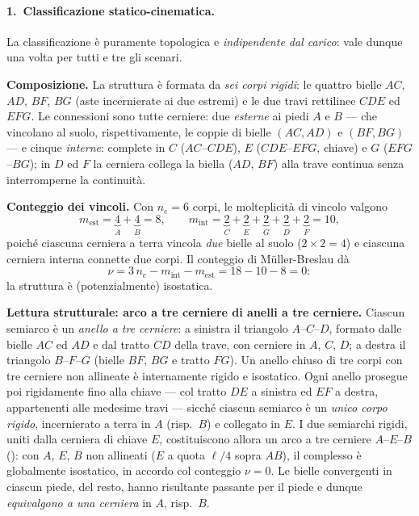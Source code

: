 \begin{esercizio}
	\begin{svolgimento}
	
	\paragraph{1.~Classificazione statico-cinematica.}
	La classificazione è puramente topologica e \emph{indipendente dal
		carico}: vale dunque una volta per tutti e tre gli scenari.
	
	\medskip\noindent\textbf{Composizione.}
	La struttura è formata da \emph{sei corpi rigidi}: le quattro bielle
	$AC$, $AD$, $BF$, $BG$ (aste incernierate ai due estremi) e le due travi
	rettilinee $CDE$ ed $EFG$. Le connessioni sono tutte cerniere: due
	\emph{esterne} ai piedi $A$ e $B$ --- che vincolano al suolo,
	rispettivamente, le coppie di bielle $(AC,AD)$ e $(BF,BG)$ --- e cinque
	\emph{interne}: complete in $C$ ($AC$--$CDE$), $E$ ($CDE$--$EFG$, chiave)
	e $G$ ($EFG$--$BG$); in $D$ ed $F$ la cerniera collega la biella ($AD$,
	$BF$) alla trave continua senza interromperne la continuità.
	
	\medskip\noindent\textbf{Conteggio dei vincoli.}
	Con $n_e=6$ corpi, le molteplicità di vincolo valgono
	\[
	m_{\mathrm{est}} = \underbrace{4}_{A} + \underbrace{4}_{B} = 8,
	\qquad
	m_{\mathrm{int}} = \underbrace{2}_{C} + \underbrace{2}_{E} + \underbrace{2}_{G}
	+ \underbrace{2}_{D} + \underbrace{2}_{F} = 10,
	\]
	poiché ciascuna cerniera a terra vincola \emph{due} bielle al suolo
	($2\times2=4$) e ciascuna cerniera interna connette due corpi. Il
	conteggio di Müller-Breslau dà
	\[
	\nu = 3\,n_e - m_{\mathrm{int}} - m_{\mathrm{est}} = 18 - 10 - 8 = 0:
	\]
	la struttura è (potenzialmente) isostatica.
	
	\medskip\noindent\textbf{Lettura strutturale: arco a tre cerniere di anelli
		a tre cerniere.}
	Ciascun semiarco è un \emph{anello a tre cerniere}: a sinistra il
	triangolo $A$--$C$--$D$, formato dalle bielle $AC$ ed $AD$ e dal tratto
	$CD$ della trave, con cerniere in $A$, $C$, $D$; a destra il triangolo
	$B$--$F$--$G$ (bielle $BF$, $BG$ e tratto $FG$). Un anello chiuso di tre
	corpi con tre cerniere non allineate è internamente rigido e isostatico.
	Ogni anello prosegue poi rigidamente fino alla chiave --- col tratto $DE$
	a sinistra ed $EF$ a destra, appartenenti alle medesime travi --- sicché
	ciascun semiarco è un \emph{unico corpo rigido}, incernierato a terra in
	$A$ (risp.\ $B$) e collegato in $E$. I due semiarchi rigidi, uniti dalla
	cerniera di chiave $E$, costituiscono allora un arco a tre
		cerniere $A$--$E$--$B$ (): con $A$, $E$,
	$B$ non allineati ($E$ a quota $\ell/4$ sopra $AB$), il complesso è
	globalmente isostatico, in accordo col conteggio $\nu=0$. Le
	bielle convergenti in ciascun piede, del resto, hanno risultante passante
	per il piede e dunque \emph{equivalgono a una cerniera} in $A$,
	risp.\ $B$.
	

\end{svolgimento}
\end{esercizio}
